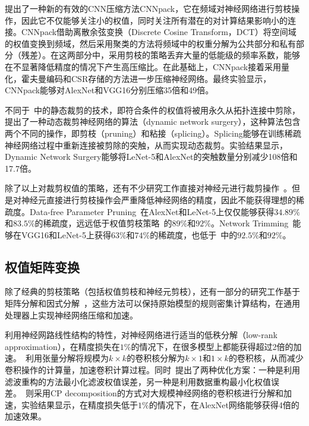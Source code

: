 \citet{wang2016cnnpack}提出了一种新的有效的CNN压缩方法CNNpack，它在频域对神经网络进行剪枝操作，因此它不仅能够关注小的权值，同时关注所有潜在的对计算结果影响小的连接。CNNpack借助离散余弦变换（Discrete Cosine Transform，DCT）将空间域的权值变换到频域，然后采用聚类的方法将频域中的权重分解为公共部分和私有部分（残差）。在这两部分中，采用剪枝的策略丢弃大量的低能级的频率系数，能够在不显著降低精度的情况下产生高压缩比。在此基础上，CNNpack接着采用量化，霍夫曼编码和CSR存储的方法进一步压缩神经网络。最终实验显示，CNNpack能够对AlexNet和VGG16分别压缩35倍和49倍。

不同于~\cite{han2015learning, han2015deep,wang2016cnnpack}中的静态裁剪的技术，即符合条件的权值将被用永久从拓扑连接中剪除，\citet{guo2016dynamic}提出了一种动态裁剪神经网络的算法（dynamic network surgery），这种算法包含两个不同的操作，即剪枝（pruning）和粘接（splicing）。Splicing能够在训练稀疏神经网络过程中重新连接被剪除的突触，从而实现动态裁剪。实验结果显示，Dynamic Network Surgery能够将LeNet-5和AlexNet的突触数量分别减少108倍和17.7倍。

除了以上对裁剪权值的策略，还有不少研究工作直接对神经元进行裁剪操作~\cite{he2014reshaping,srinivas2015data,hu2016network,mariet2015diversity}。但是对神经元直接进行剪枝操作会严重降低神经网络的精度，因此不能获得理想的稀疏度。Data-free Parameter Pruning~\cite{srinivas2015data}在AlexNet和LeNet-5上仅仅能够获得$34.89\%$和$83.5\%$的稀疏度，远远低于权值剪枝策略~\cite{han2015learning}的$89\%$和$92\%$。Network Trimming~\cite{hu2016network}能够在VGG16和LeNet-5上获得$63\%$和$74\%$的稀疏度，也低于~\cite{han2015learning}中的$92.5\%$和$92\%$。

\subsection{权值矩阵变换}
除了经典的剪枝策略（包括权值剪枝和神经元剪枝），还有一部分的研究工作基于矩阵分解和因式分解~\cite{denton2014exploiting,jaderberg2014speeding,lebedev2014speeding}，这些方法可以保持原始模型的规则密集计算结构，在通用处理器上实现神经网络压缩和加速。

\citet{denton2014exploiting}利用神经网路线性结构的特性，对神经网络进行适当的低秩分解（low-rank approximation），在精度损失在$1\%$的情况下，在很多模型上都能获得超过2倍的加速。~\citet{jaderberg2014speeding}利用张量分解将规模为$k\times k$的卷积核分解为$k\times 1$和$1\times k$的卷积核，从而减少卷积操作的计算量，加速卷积计算过程。同时~\cite{jaderberg2014speeding}提出了两种优化方案：一种是利用滤波重构的方法最小化滤波权值误差，另一种是利用数据重构最小化权值误差。~\citet{lebedev2014speeding}则采用CP decomposition的方式对大规模神经网络的卷积核进行分解和加速，实验结果显示，在精度损失低于$1\%$的情况下，在AlexNet网络能够获得4倍的加速效果。



